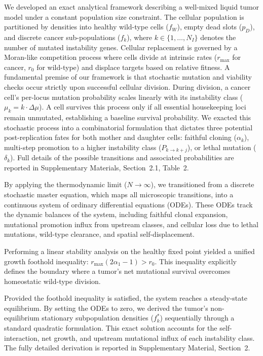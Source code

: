 \documentclass[10pt, aps, rmp,  twocolumn, superscriptaddress, floatfix, showkeys]{revtex4-2}
\begin{document}
We developed an exact analytical framework describing a well-mixed liquid tumor model under a constant population size constraint. The cellular population is partitioned by densities into healthy wild-type cells ($f_W$), empty dead slots ($p_D$), and discrete cancer sub-populations ($f_k$), where $k \in \{1, \dots, N_I\}$ denotes the number of mutated instability genes. Cellular replacement is governed by a Moran-like competition process where cells divide at intrinsic rates ($r_{\text{max}}$ for cancer, $r_0$ for wild-type) and displace targets based on relative fitness.  
A fundamental premise of our framework is that stochastic mutation and viability checks occur strictly upon successful cellular division. During division, a cancer cell's per-locus mutation probability scales linearly with its instability class ($\mu_k = k \cdot \Delta\mu$). A cell survives this process only if all essential housekeeping loci remain unmutated, establishing a baseline survival probability. We exacted this stochastic process into a combinatorial formulation that dictates three potential post-replication fates for both mother and daughter cells: faithful cloning ($\alpha_k$), multi-step promotion to a higher instability class ($P_{k \to k+j}$), or lethal mutation ($\delta_k$). Full details of the possible transitions and associated probabilities are reported in Supplementary Materials, Section~2.1, Table~2. 

By applying the thermodynamic limit ($N \to \infty$), we transitioned from a discrete stochastic master equation, which maps all microscopic transitions, into a continuous system of ordinary differential equations (ODEs). These ODEs track the dynamic balances of the system, including faithful clonal expansion, mutational promotion influx from upstream classes, and cellular loss due to lethal mutations, wild-type clearance, and spatial self-displacement.  

Performing a linear stability analysis on the healthy fixed point yielded a unified growth foothold inequality: $r_{\text{max}} (2\alpha_1 - 1) > r_0$. This inequality explicitly defines the boundary where a tumor's net mutational survival overcomes homeostatic wild-type division.  

Provided the foothold inequality is satisfied, the system reaches a steady-state equilibrium. By setting the ODEs to zero, we derived the tumor's non-equilibrium stationary subpopulation densities ($f_k^*$) sequentially through a standard quadratic formulation. This exact solution accounts for the self-interaction, net growth, and upstream mutational influx of each instability class.  
The fully detailed derivation is reported in Supplementary Material, Section~2.
\end{document}
